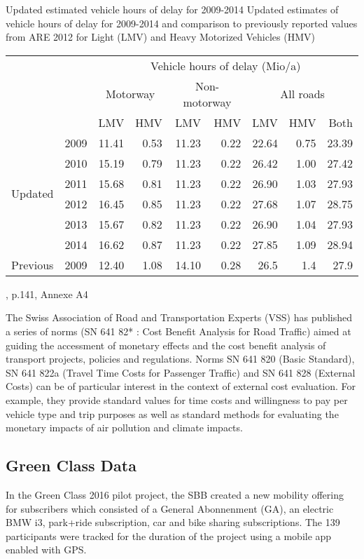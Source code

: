\createtable%
{Updated estimated vehicle hours of delay for 2009-2014}%
{Updated estimates of vehicle hours of delay for 2009-2014 and comparison to previously reported values from ARE 2012 for Light (LMV) and Heavy Motorized Vehicles (HMV)}%
{\label{tab:vehHoursDelayMkInfras}}%
{%
  \begin{tabular}[c]{lrrrrrrrr}
    \toprule
    \multirow{3}{*}{} & & \multicolumn{7}{c}{Vehicle hours of delay (Mio/a)}\\ 
    & & \multicolumn{2}{c}{Motorway} & \multicolumn{2}{c}{Non-motorway} & \multicolumn{3}{c}{All roads}\\
    & &  LMV & HMV & LMV & HMV & LMV & HMV & Both\\
    \midrule
    \multirow{6}{*}{Updated}
    & 2009 & 11.41 & 0.53 & 11.23 & 0.22 & 22.64 & 0.75 & 23.39 \\
    & 2010 & 15.19 & 0.79 & 11.23 & 0.22 & 26.42 & 1.00 & 27.42 \\
    & 2011 & 15.68 & 0.81 & 11.23 & 0.22 & 26.90 & 1.03 & 27.93 \\
    & 2012 & 16.45 & 0.85 & 11.23 & 0.22 & 27.68 & 1.07 & 28.75 \\
    & 2013 & 15.67 & 0.82 & 11.23 & 0.22 & 26.90 & 1.04 & 27.93 \\
    & 2014 & 16.62 & 0.87 & 11.23 & 0.22 & 27.85 & 1.09 & 28.94 \\
    \midrule
    Previous & 2009 & 12.40 & 1.08 & 14.10 & 0.28 & 26.5 & 1.4 & 27.9 \\
    \bottomrule
  \end{tabular}
}%
{\cite{mkinfras2016staukosten}, p.141, Annexe A4}

The Swiss Association of Road and Transportation Experts (VSS) has published a series of norms (SN 641 82* : Cost Benefit Analysis
for Road Traffic) aimed at guiding the accessment of monetary effects and the cost benefit analysis of transport projects, policies and regulations.
Norms SN 641 820 (Basic Standard), SN 641 822a (Travel Time Costs for Passenger Traffic) and SN 641 828 (External Costs) can be of particular interest in the context of external cost evaluation.
For example, they provide standard values for time costs and willingness to pay per vehicle type and trip purposes as well as standard methods for evaluating the monetary impacts of air pollution and climate impacts.
 

\subsection{Green Class Data}
In the Green Class 2016 pilot project, the SBB created a new mobility offering for subscribers which consisted of a General Abonnenment (GA), an electric BMW i3, park+ride subscription, car and bike sharing subscriptions.
The 139 participants were tracked for the duration of the project using a mobile app enabled with GPS.


